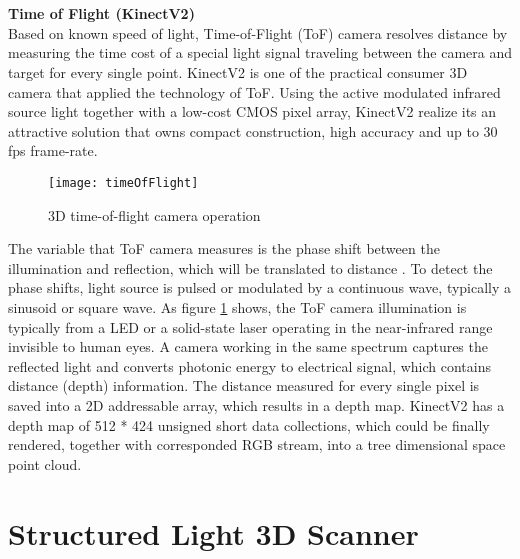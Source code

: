 %
\\
\\\textbf{Time of Flight (KinectV2)}\\
Based on known speed of light, Time-of-Flight (ToF) camera resolves distance by measuring the time cost of a special light signal traveling between the camera and target for every single point. KinectV2 is one of the practical consumer 3D camera that applied the technology of ToF. Using the active modulated infrared source light together with a low-cost CMOS pixel array, KinectV2 realize its an attractive solution that owns compact construction, high accuracy and up to 30 fps frame-rate.\par%
%
%
\begin{figure}[H]
\centering
\texttt{[image: timeOfFlight]}
\caption{3D time-of-flight camera operation \cite{TimeOfFlight}}
\label{timeOfFlight}
\end{figure}%
%
\noindent
The variable that ToF camera measures is the phase shift between the illumination and reflection, which will be translated to distance \cite{TimeOfFlight}. %
To detect the phase shifts, light source is pulsed or modulated by a continuous wave, typically a sinusoid or square wave.
As figure \ref{timeOfFlight} shows, the ToF camera illumination is typically from a LED or a solid-state laser operating in the near-infrared range invisible to human eyes. A camera working in the same spectrum captures the reflected light and converts photonic energy to electrical signal, which contains distance (depth) information.
The distance measured for every single pixel is saved into a 2D addressable array, which results in a depth map. KinectV2 has a depth map of 512 * 424 unsigned short data collections, which could be finally rendered, together with corresponded RGB stream,  into a tree dimensional space point cloud.

\section{Structured Light 3D Scanner} %
\label{sectionSL3DCalibration} %

